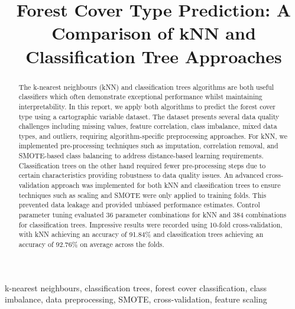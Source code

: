 \documentclass[10pt, conference]{IEEEtran}
\begin{document}
\title{Forest Cover Type Prediction: A Comparison of kNN and Classification Tree Approaches\\

}

\author{
}

\maketitle

\begin{abstract}
The k-nearest neighbours (kNN) and classification trees algorithms are both useful classifiers which often demonstrate exceptional performance whilst maintaining interpretability. In this report, we apply both algorithms to predict the forest cover type using a cartographic variable dataset. The dataset presents several data quality challenges including missing values, feature correlation, class imbalance, mixed data types, and outliers, requiring algorithm-specific preprocessing approaches. For kNN, we implemented pre-processing techniques such as imputation, correlation removal, and SMOTE-based class balancing to address distance-based learning requirements. Classification trees on the other hand required fewer pre-processing steps due to certain characteristics providing robustness to data quality issues. An advanced cross-validation approach was implemented for both kNN and classification trees to ensure techniques such as scaling and SMOTE were only applied to training folds. This prevented data leakage and provided unbiased performance estimates. Control parameter tuning evaluated 36 parameter combinations for kNN and 384 combinations for classification trees. Impressive results were recorded using 10-fold cross-validation, with kNN achieving an accuracy of 91.84\% and classification trees achieving an accuracy of 92.76\% on average across the folds.
\end{abstract}

\begin{IEEEkeywords}
k-nearest neighbours, classification trees, forest cover classification, class imbalance, data preprocessing, SMOTE, cross-validation, feature scaling
\end{IEEEkeywords}
\end{document}
